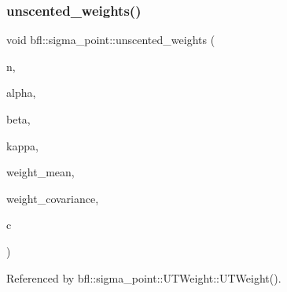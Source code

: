 \subsubsection{\texorpdfstring{unscented\+\_\+weights()}{unscented\_weights()}}
{\footnotesize\ttfamily void bfl\+::sigma\+\_\+point\+::unscented\+\_\+weights (\begin{DoxyParamCaption}\item[{const std\+::size\+\_\+t}]{n,  }\item[{const double}]{alpha,  }\item[{const double}]{beta,  }\item[{const double}]{kappa,  }\item[{Eigen\+::\+Ref$<$ Eigen\+::\+Vector\+Xd $>$}]{weight\+\_\+mean,  }\item[{Eigen\+::\+Ref$<$ Eigen\+::\+Vector\+Xd $>$}]{weight\+\_\+covariance,  }\item[{double \&}]{c }\end{DoxyParamCaption})}



Referenced by bfl\+::sigma\+\_\+point\+::\+U\+T\+Weight\+::\+U\+T\+Weight().

